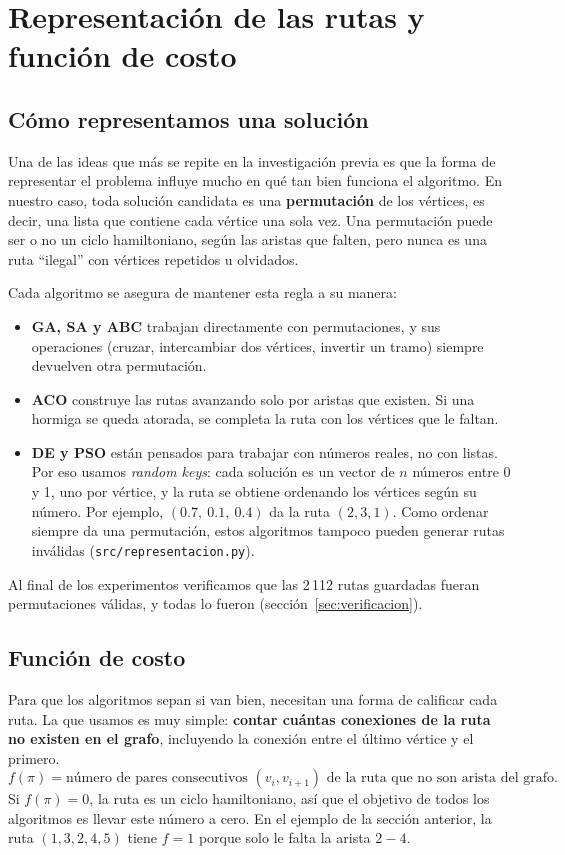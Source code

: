 \chapter{Representación de las rutas y función de costo}
\label{cap:repr}

\section{Cómo representamos una solución}
Una de las ideas que más se repite en la investigación previa es que la forma de representar el
problema influye mucho en qué tan bien funciona el algoritmo. En nuestro caso, toda solución
candidata es una \textbf{permutación} de los vértices, es decir, una lista que contiene cada
vértice una sola vez. Una permutación puede ser o no un ciclo hamiltoniano, según las aristas que
falten, pero nunca es una ruta ``ilegal'' con vértices repetidos u olvidados.

Cada algoritmo se asegura de mantener esta regla a su manera:
\begin{itemize}
  \item \textbf{GA, SA y ABC} trabajan directamente con permutaciones, y sus operaciones
        (cruzar, intercambiar dos vértices, invertir un tramo) siempre devuelven otra permutación.
  \item \textbf{ACO} construye las rutas avanzando solo por aristas que existen. Si una hormiga
        se queda atorada, se completa la ruta con los vértices que le faltan.
  \item \textbf{DE y PSO} están pensados para trabajar con números reales, no con listas. Por eso
        usamos \emph{random keys}: cada solución es un vector de $n$ números entre 0 y 1, uno por
        vértice, y la ruta se obtiene ordenando los vértices según su número. Por ejemplo,
        $(0.7,\ 0.1,\ 0.4)$ da la ruta $(2,3,1)$. Como ordenar siempre da una permutación, estos
        algoritmos tampoco pueden generar rutas inválidas (\texttt{src/representacion.py}).
\end{itemize}

Al final de los experimentos verificamos que las 2\,112 rutas guardadas fueran permutaciones
válidas, y todas lo fueron (sección~\ref{sec:verificacion}).

\section{Función de costo}
Para que los algoritmos sepan si van bien, necesitan una forma de calificar cada ruta. La que
usamos es muy simple: \textbf{contar cuántas conexiones de la ruta no existen en el grafo},
incluyendo la conexión entre el último vértice y el primero.
\[
f(\pi)=\text{número de pares consecutivos }(v_i,v_{i+1})\text{ de la ruta que no son arista del grafo}.
\]
Si $f(\pi)=0$, la ruta es un ciclo hamiltoniano, así que el objetivo de todos los algoritmos es
llevar este número a cero. En el ejemplo de la sección anterior, la ruta $(1,3,2,4,5)$ tiene
$f=1$ porque solo le falta la arista $2\!-\!4$.

